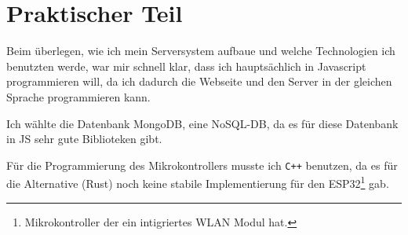 \documentclass[a4paper, ngerman, 12pt]{scrartcl}
\begin{document}
\section{Praktischer Teil}

Beim überlegen, wie ich mein Serversystem aufbaue und welche Technologien ich benutzten werde, war mir schnell klar, dass ich hauptsächlich in Javascript programmieren will, da ich dadurch die Webseite und den Server in der gleichen Sprache programmieren kann.

Ich wählte die Datenbank MongoDB, eine NoSQL-DB, da es für diese Datenbank in JS sehr gute Biblioteken gibt. 

Für die Programmierung des Mikrokontrollers musste ich \texttt{C++} benutzen, da es für die Alternative (Rust)
noch keine stabile Implementierung für den ESP32\footnote{Mikrokontroller der ein intigriertes WLAN Modul hat.} gab.



\clearpage{}
\printbibliography{}
\end{document}
